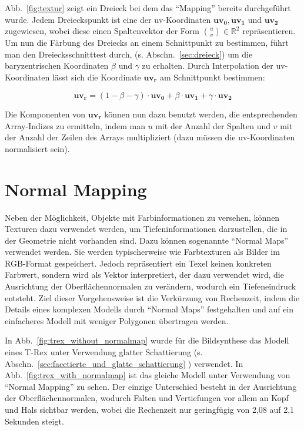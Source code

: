 Abb.~\ref{fig:textur} zeigt ein Dreieck bei dem das "`Mapping"' bereits durchgeführt wurde. Jedem Dreieckspunkt ist eine der uv-Koordinaten \( \boldsymbol{uv_0}, \boldsymbol{uv_1} \text{ und } \boldsymbol{uv_2}\)  zugewiesen, wobei diese einen Spaltenvektor der Form \( \binom{u}{v} \in \mathds{R}^2 \) repräsentieren. Um nun die Färbung des Dreiecks an einem Schnittpunkt zu bestimmen, führt man den Dreiecksschnitttest durch, (s. Abschn.~\ref{sec:dreieck}) um die baryzentrischen Koordinaten \( \beta \text{ und } \gamma \) zu erhalten. Durch Interpolation der uv-Koordinaten lässt sich die Koordinate \( \boldsymbol{uv_r} \) am Schnittpunkt  bestimmen:

\begin{equation*}
    \boldsymbol{uv_r} = (1 - \beta - \gamma) \cdot \boldsymbol{uv_0} + \beta \cdot \boldsymbol{uv_1} + \gamma \cdot \boldsymbol{uv_2}
\end{equation*}

Die Komponenten von \( \boldsymbol{uv_r} \) können nun dazu benutzt werden, die entsprechenden Array-Indizes zu ermitteln, indem man \( u \) mit der Anzahl der Spalten und \( v \) mit der Anzahl der Zeilen des Arrays multipliziert (dazu müssen die uv-Koordinaten normalisiert sein).


\section{Normal Mapping}

\FloatBarrier


Neben der Möglichkeit, Objekte mit Farbinformationen zu versehen, können Texturen dazu verwendet werden, um Tiefeninformationen darzustellen, die in der Geometrie nicht vorhanden sind. Dazu können sogenannte "`Normal Maps"' verwendet werden. Sie werden typischerweise wie Farbtexturen als Bilder im RGB-Format gespeichert. Jedoch repräsentiert ein Texel keinen konkreten Farbwert, sondern wird als Vektor interpretiert, der dazu verwendet wird, die Ausrichtung der Oberflächennormalen zu verändern, wodurch ein Tiefeneindruck entsteht. Ziel dieser Vorgehensweise ist die Verkürzung von Rechenzeit, indem die Details eines komplexen Modells durch "`Normal Maps"' festgehalten und auf ein einfacheres Modell mit weniger Polygonen übertragen werden.

In Abb.~\ref{fig:trex_without_normalmap} wurde für die Bildsynthese das Modell eines T-Rex unter Verwendung glatter Schattierung (s. Abschn.~\ref{sec:facetierte_und_glatte_schattierung} ) verwendet. In Abb.~\ref{fig:trex_with_normalmap} ist das gleiche Modell unter Verwendung von "`Normal Mapping"' zu sehen.
Der einzige Unterschied besteht in der Ausrichtung der Oberflächennormalen, wodurch Falten und Vertiefungen vor allem an Kopf und Hals sichtbar werden, wobei die Rechenzeit nur geringfügig von 2,08 auf 2,1 Sekunden steigt.

